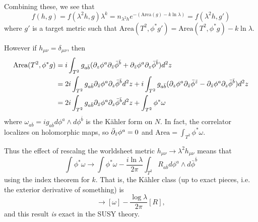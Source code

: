 Combining these, we see that
\begin{equation}
    f(h,g)=f(\lambda^2 h,g)\lambda^k = n_{\lambda^2 h} e^{-(\text{Area}(g)-k\ln \lambda)} = f(\lambda^2 h,g')
\end{equation}
where $g'$ is a target metric such that $\text{Area}(T^2,\phi^* g') = \text{Area}(T^2, \phi^* g) - k\ln \lambda.$

However if $h_{\mu\nu}=\delta_{\mu\nu}$, then
\begin{align*}
    \text{Area}(T^2,\phi^* g) &= i \int_{T^2} g_{a\bar b}(\partial_z \phi^a \partial_{\bar z} \bar \phi^{\bar b}+\partial_{\bar z} \phi^a \partial_z \bar \phi^{\bar b})d^2z\\
        &=2i \int_{T^2} g_{a\bar b} \partial_{\bar z} \phi^a \partial_z \bar \phi^{\bar b} d^2z+ i\int_{T^2} g_{a\bar b} (\partial_z \phi^a \partial_{\bar z} \bar \phi^{\bar z}-\partial_{\bar z} \phi^a \partial_z \bar \phi^{\bar b})d^2 z\\
        &= 2i \int_{T^2} g_{a\bar b} \partial_{\bar z} \phi^a \partial_z \bar \phi^{\bar b} d^2 z +\int_{T^2} \phi^* \omega
\end{align*}
where $\omega_{a\bar b}=ig_{a\bar b} d\phi^a \wedge d\phi^{\bar b}$ is the K\"ahler form on $N$. In fact, the correlator localizes on holomorphic maps, so $\bar {\partial}_{\bar z} \phi^a=0$ and $\text{Area}=\int_{T^2} \phi^* \omega$.

Thus the effect of rescalng the worldsheet metric $h_{\mu\nu}\to\lambda^2 h_{\mu\nu}$ means that 
\begin{equation}
    \int \phi^* \omega \to \int \phi^* \omega - \frac{i\ln \lambda}{2\pi} \int_{T^2} R_{a\bar b} d\phi^a \wedge d\bar \phi^{\bar b}
\end{equation}
using the index theorem for $k$. That is, the K\"ahler class (up to exact pieces, i.e. the exterior derivative of something) is
\begin{equation}
    [\omega]\to [\omega]-\frac{\log \lambda}{2\pi}[R],
\end{equation}
and this result \emph{is} exact in the SUSY theory.